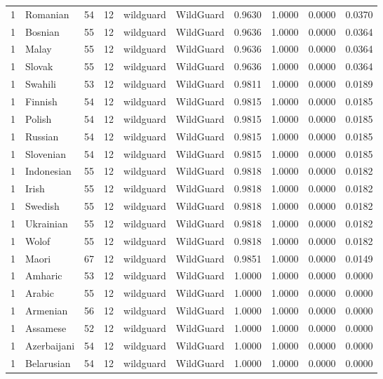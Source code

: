 \begin{tabular}{rlrrllrrrr}
1 & Romanian & 54 & 12 & wildguard & WildGuard & 0.9630 & 1.0000 & 0.0000 & 0.0370 \\
1 & Bosnian & 55 & 12 & wildguard & WildGuard & 0.9636 & 1.0000 & 0.0000 & 0.0364 \\
1 & Malay & 55 & 12 & wildguard & WildGuard & 0.9636 & 1.0000 & 0.0000 & 0.0364 \\
1 & Slovak & 55 & 12 & wildguard & WildGuard & 0.9636 & 1.0000 & 0.0000 & 0.0364 \\
1 & Swahili & 53 & 12 & wildguard & WildGuard & 0.9811 & 1.0000 & 0.0000 & 0.0189 \\
1 & Finnish & 54 & 12 & wildguard & WildGuard & 0.9815 & 1.0000 & 0.0000 & 0.0185 \\
1 & Polish & 54 & 12 & wildguard & WildGuard & 0.9815 & 1.0000 & 0.0000 & 0.0185 \\
1 & Russian & 54 & 12 & wildguard & WildGuard & 0.9815 & 1.0000 & 0.0000 & 0.0185 \\
1 & Slovenian & 54 & 12 & wildguard & WildGuard & 0.9815 & 1.0000 & 0.0000 & 0.0185 \\
1 & Indonesian & 55 & 12 & wildguard & WildGuard & 0.9818 & 1.0000 & 0.0000 & 0.0182 \\
1 & Irish & 55 & 12 & wildguard & WildGuard & 0.9818 & 1.0000 & 0.0000 & 0.0182 \\
1 & Swedish & 55 & 12 & wildguard & WildGuard & 0.9818 & 1.0000 & 0.0000 & 0.0182 \\
1 & Ukrainian & 55 & 12 & wildguard & WildGuard & 0.9818 & 1.0000 & 0.0000 & 0.0182 \\
1 & Wolof & 55 & 12 & wildguard & WildGuard & 0.9818 & 1.0000 & 0.0000 & 0.0182 \\
1 & Maori & 67 & 12 & wildguard & WildGuard & 0.9851 & 1.0000 & 0.0000 & 0.0149 \\
1 & Amharic & 53 & 12 & wildguard & WildGuard & 1.0000 & 1.0000 & 0.0000 & 0.0000 \\
1 & Arabic & 55 & 12 & wildguard & WildGuard & 1.0000 & 1.0000 & 0.0000 & 0.0000 \\
1 & Armenian & 56 & 12 & wildguard & WildGuard & 1.0000 & 1.0000 & 0.0000 & 0.0000 \\
1 & Assamese & 52 & 12 & wildguard & WildGuard & 1.0000 & 1.0000 & 0.0000 & 0.0000 \\
1 & Azerbaijani & 54 & 12 & wildguard & WildGuard & 1.0000 & 1.0000 & 0.0000 & 0.0000 \\
1 & Belarusian & 54 & 12 & wildguard & WildGuard & 1.0000 & 1.0000 & 0.0000 & 0.0000 \\

\end{tabular}
